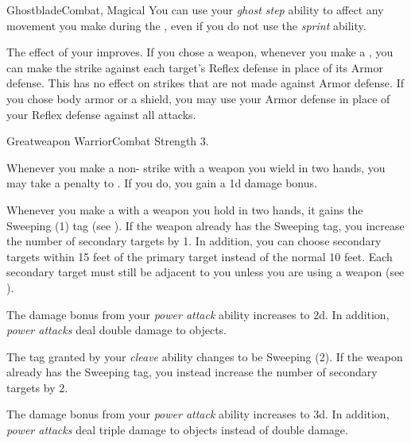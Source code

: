 \begin{feat}{Ghostblade}{Combat, Magical}
         You can use your \textit{ghost step} ability to affect any movement you make during the , even if you do not use the \textit{sprint} ability.

         The effect of your  improves.
        If you chose a weapon, whenever you make a , you can make the strike against each target's Reflex defense in place of its Armor defense.
        This has no effect on strikes that are not made against Armor defense.
        If you chose body armor or a shield, you may use your Armor defense in place of your Reflex defense against all attacks.
    \end{feat}

    \begin{feat}{Greatweapon Warrior}{Combat}
        \featpre Strength 3.

         Whenever you make a non- strike with a weapon you wield in two hands, you may take a  penalty to .
        If you do, you gain a \plus1d damage bonus.

         Whenever you make a   with a weapon you hold in two hands, it gains the Sweeping (1) tag (see ).
        If the weapon already has the Sweeping tag, you increase the number of secondary targets by 1.
        In addition, you can choose secondary targets within 15 feet of the primary target instead of the normal 10 feet.
        Each secondary target must still be adjacent to you unless you are using a  weapon (see ).

         The damage bonus from your \textit{power attack} ability increases to \plus2d.
        In addition, \textit{power attacks} deal double damage to objects.

         The tag granted by your \textit{cleave} ability changes to be Sweeping (2).
        If the weapon already has the Sweeping tag, you instead increase the number of secondary targets by 2.

         The damage bonus from your \textit{power attack} ability increases to \plus3d.
        In addition, \textit{power attacks} deal triple damage to objects instead of double damage.
    \end{feat}

